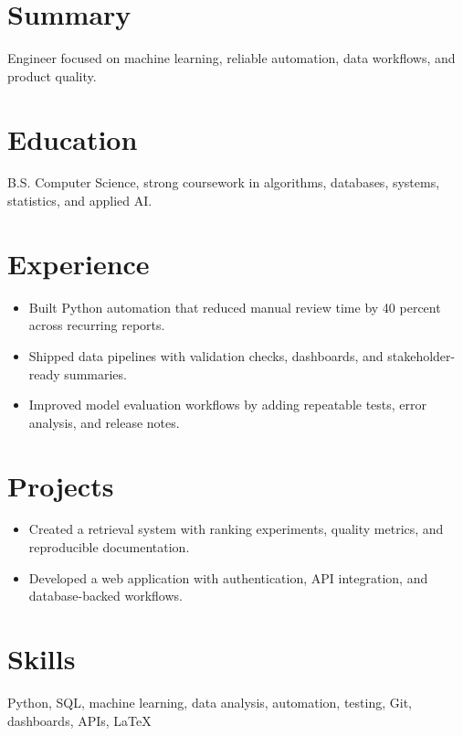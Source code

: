 \documentclass[10pt]{article}
\begin{document}
\section*{Summary}
Engineer focused on machine learning, reliable automation, data workflows, and product quality.
\section*{Education}
B.S. Computer Science, strong coursework in algorithms, databases, systems, statistics, and applied AI.
\section*{Experience}
\begin{itemize}\item Built Python automation that reduced manual review time by 40 percent across recurring reports.\item Shipped data pipelines with validation checks, dashboards, and stakeholder-ready summaries.\item Improved model evaluation workflows by adding repeatable tests, error analysis, and release notes.\end{itemize}
\section*{Projects}
\begin{itemize}\item Created a retrieval system with ranking experiments, quality metrics, and reproducible documentation.\item Developed a web application with authentication, API integration, and database-backed workflows.\end{itemize}
\section*{Skills}
Python, SQL, machine learning, data analysis, automation, testing, Git, dashboards, APIs, LaTeX
\end{document}

